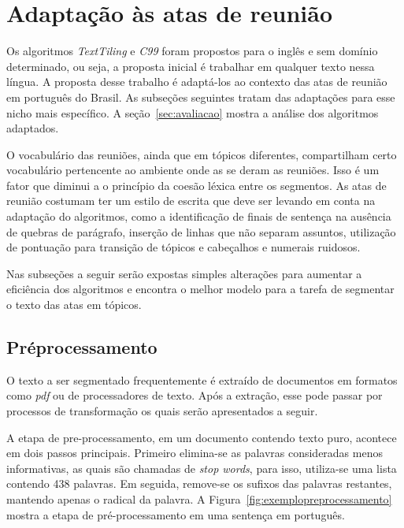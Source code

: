 \section{Adaptação às atas de reunião}
	\label{sec:adaptacaoasatas}



	Os algoritmos \textit{TextTiling} e \textit{C99} foram propostos para o inglês e sem domínio determinado, ou seja, a proposta inicial é trabalhar em qualquer texto nessa língua.
	A proposta desse trabalho é adaptá-los ao contexto das atas de reunião em português do Brasil. As subseções seguintes tratam das adaptações para esse nicho mais específico. A seção~\ref{sec:avaliacao} mostra a análise dos algoritmos adaptados.

O vocabulário das reuniões, ainda que em tópicos diferentes, compartilham certo vocabulário pertencente ao ambiente onde as se deram as reuniões. Isso é um fator que diminui a o princípio da coesão léxica entre os segmentos.
As atas de reunião costumam ter um estilo de escrita que deve ser levando em conta na adaptação do algoritmos, como a identificação de finais de sentença na ausência de quebras de parágrafo, inserção de linhas que não separam assuntos, utilização de pontuação para transição de tópicos e cabeçalhos e numerais ruidosos. 

Nas subseções a seguir serão expostas simples alterações para aumentar a eficiência dos algoritmos e encontra o melhor modelo para a tarefa de segmentar o texto das atas em tópicos.


\subsection{Préprocessamento}
	\label{subsec:preprocessamento}




	O texto a ser segmentado frequentemente é extraído de documentos em formatos como \textit{pdf} ou de processadores de texto. Após a extração, esse pode passar por processos de transformação os quais serão apresentados a seguir.

	A etapa de pre-processamento, em um documento contendo texto puro, acontece em dois passos principais. Primeiro elimina-se as palavras consideradas menos informativas, as quais são chamadas de \textit{stop words}, para isso, utiliza-se uma lista contendo 438 palavras. Em seguida, remove-se os sufixos das palavras restantes, mantendo apenas o radical da palavra. A Figura~\ref{fig:exemplopreprocessamento} mostra a etapa de pré-processamento em uma sentença em português.
	



